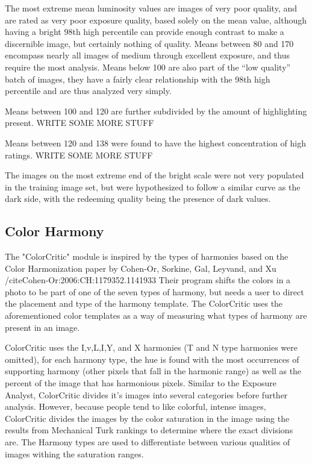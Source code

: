 \documentclass[twocolumn]{article}
\begin{document}
The most extreme mean luminosity values are images of very poor quality, and are rated as very poor exposure quality, based solely on the mean value, although having a bright 98th high percentile can provide enough contrast to make a discernible image, but certainly nothing of quality. Means between 80 and 170 encompass nearly all images of medium through excellent exposure, and thus require the most analysis. Means below 100 are also part of the “low quality” batch of images, they have a fairly clear relationship with the 98th high percentile and are thus analyzed very simply.

Means between 100 and 120 are further subdivided by the amount of highlighting present. WRITE SOME MORE STUFF

Means between 120 and 138 were found to have the highest concentration of high ratings. WRITE SOME MORE STUFF

The images on the most extreme end of the bright scale were not very populated in the training image set, but were hypothesized to follow a similar curve as the dark side, with the redeeming quality being the presence of dark values.

\subsection{Color Harmony}   
The "ColorCritic" module is inspired by the types of harmonies based on the Color Harmonization paper by Cohen-Or, Sorkine, Gal, Leyvand, and Xu /cite{Cohen-Or:2006:CH:1179352.1141933} Their program shifts the colors in a photo to be part of one of the seven types of harmony, but needs a user to direct the placement and type of the harmony template. The ColorCritic uses the aforementioned color templates as a way of measuring what types of harmony are present in an image.

ColorCritic uses the I,v,L,I,Y, and X harmonies (T and N type harmonies were omitted), for each harmony type, the hue is found with the most occurrences of supporting harmony (other pixels that fall in the harmonic range) as well as the percent of the image that has harmonious pixels. Similar to the Exposure Analyst, ColorCritic divides it's images into several categories before further analysis. However, because people tend to like colorful, intense images, ColorCritic divides the images by the color saturation in the image using the results from Mechanical Turk rankings to determine where the exact divisions are. The Harmony types are used to differentiate between various qualities of images withing the saturation ranges.
\end{document}
